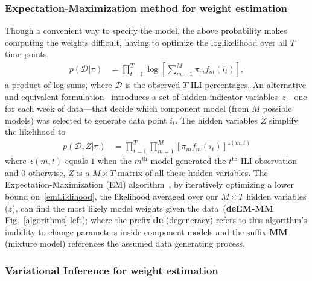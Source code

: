 \documentclass[12pt]{article}
\def\l{\left}
\def\r{\right}
\begin{document}
\subsubsection{Expectation-Maximization method for weight estimation}
Though a convenient way to specify the model, the above probability makes computing the weights difficult, having to optimize the loglikelihood over all $T$ time points,
\begin{equation}
  \begin{aligned}
    p(\mathcal{D} | \pi ) &= \prod_{t=1}^{T} \log\l[\sum_{m=1}^{M} \pi_m f_{m}(i_{t})\r],
  \end{aligned}
\end{equation}
a product of log-sums, where $\mathcal{D}$ is the observed $T$ ILI percentages.
An alternative and equivalent formulation~\cite{bishop2006pattern,murphy2012machine} introduces a set of hidden indicator variables~$z$---one for each week of data---that decide which component model (from $M$ possible models) was selected to generate data point $i_{t}$.
The hidden variables $Z$ simplify the likelihood to
\begin{equation}
  \begin{aligned}
    p(\mathcal{D},Z | \pi ) &= \prod_{t=1}^{T} \prod_{m=1}^{M} \l[\pi_m f_{m}(i_{t})\r]^{z(m,t)}\label{emLiklihood}
  \end{aligned}
\end{equation}
where $z(m,t)$ equals $1$ when the $m^{\text{th}}$ model generated the $t^{\text{th}}$ ILI observation and $0$ otherwise, $Z$ is a $M \times T$ matrix of all these hidden variables.
The Expectation-Maximization (EM) algorithm~\cite{dempster1977maximum,reich2019collaborativepnas}, by iteratively optimizing a lower  bound on~\eqref{emLiklihood}, the likelihood averaged over our $M \times T$ hidden variables ($z$), can find the most likely model weights given the data~(\textbf{deEM-MM} Fig.~\ref{algorithms} left); where the prefix \textbf{de} (degeneracy) refers to this algorithm's inability to change parameters inside component models and the suffix \textbf{MM} (mixture model) references the assumed data generating process.

 
\subsubsection{Variational Inference for weight estimation}
\end{document}
